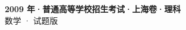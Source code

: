 \documentclass[zihao=-4, a4paper]{ctexart}
\begin{document}
\begin{center}
  {\Large\bfseries 2009 年·普通高等学校招生考试·上海卷·理科}\\[4pt]
  {\large 数学 · 试题版}
\end{center}
\medskip
{}

\end{document}
